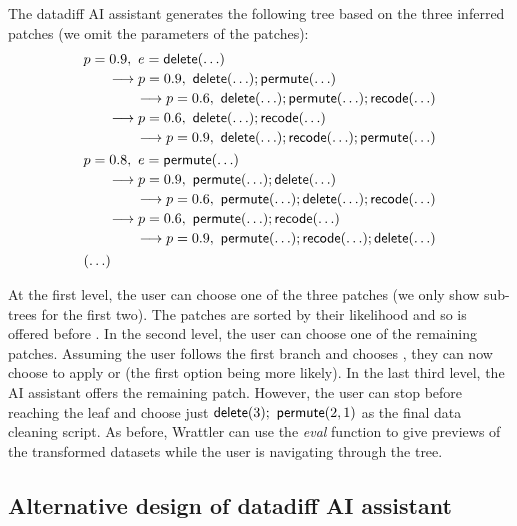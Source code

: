 \documentclass{article}
\begin{document}
The datadiff AI assistant generates the following tree based on the three inferred patches 
(we omit the parameters of the patches):
%
\begin{equation*}
\begin{array}{l}
p=0.9,~ e=\textnormal{\sffamily delete}(\ldots)\\[0.2em]
\qquad\longrightarrow p=0.9,~ \textnormal{\sffamily delete}(\ldots); \textnormal{\sffamily permute}(\ldots)\\[0.2em]
\qquad\qquad\longrightarrow p=0.6,~ \textnormal{\sffamily delete}(\ldots); \textnormal{\sffamily permute}(\ldots); \textnormal{\sffamily recode}(\ldots)\\[0.2em]
\qquad\longrightarrow p=0.6,~ \textnormal{\sffamily delete}(\ldots); \textnormal{\sffamily recode}(\ldots)\\[0.2em]
\qquad\qquad\longrightarrow p=0.9,~ \textnormal{\sffamily delete}(\ldots); \textnormal{\sffamily recode}(\ldots); \textnormal{\sffamily permute}(\ldots)\\[0.4em]
p=0.8,~ e=\textnormal{\sffamily permute}(\ldots)\\[0.2em]
\qquad\longrightarrow p=0.9,~ \textnormal{\sffamily permute}(\ldots); \textnormal{\sffamily delete}(\ldots)\\[0.2em]
\qquad\qquad\longrightarrow p=0.6,~ \textnormal{\sffamily permute}(\ldots); \textnormal{\sffamily delete}(\ldots); \textnormal{\sffamily recode}(\ldots)\\[0.2em]
\qquad\longrightarrow p=0.6,~ \textnormal{\sffamily permute}(\ldots); \textnormal{\sffamily recode}(\ldots)\\[0.2em]
\qquad\qquad\longrightarrow p=0.9,~ \textnormal{\sffamily permute}(\ldots); \textnormal{\sffamily recode}(\ldots); \textnormal{\sffamily delete}(\ldots)\\[0.4em]
(\ldots)
\end{array}
\end{equation*}

At the first level, the user can choose one of the three patches (we only show sub-trees for the first two). 
The patches are sorted by their likelihood and so  is offered before . In the
second level, the user can choose one of the remaining patches. Assuming the user follows the first
branch and chooses , they can now choose to apply  or  (the
first option being more likely). In the last third level, the AI assistant offers the remaining patch. 
However, the user can stop before reaching the leaf and choose just
$\textnormal{\sffamily delete}(3);~ \textnormal{\sffamily permute}(2,1)$ as the final data cleaning script. As before, Wrattler 
can use the \emph{eval} function to give previews of the transformed datasets while the user is 
navigating through the tree.

\subsection{Alternative design of datadiff AI assistant}
\end{document}
